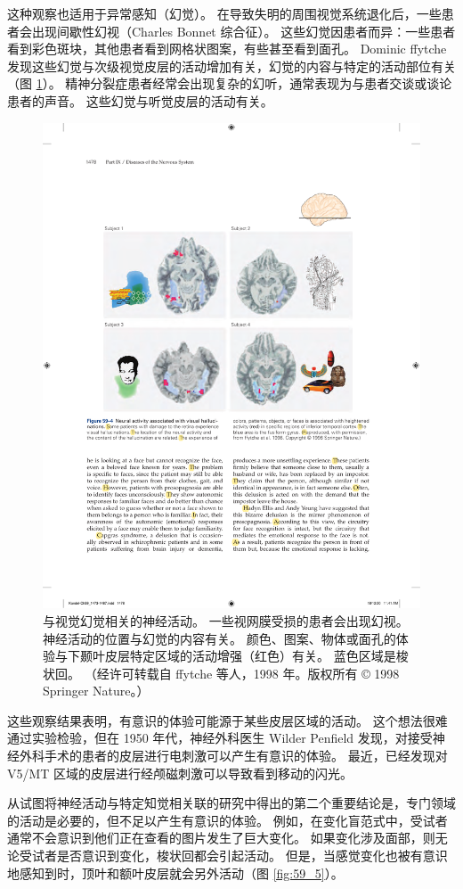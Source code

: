 这种观察也适用于异常感知（幻觉）。 在导致失明的周围视觉系统退化后，一些患者会出现间歇性幻视（Charles Bonnet 综合征）。 这些幻觉因患者而异：一些患者看到彩色斑块，其他患者看到网格状图案，有些甚至看到面孔。 
Dominic ffytche 发现这些幻觉与次级视觉皮层的活动增加有关，幻觉的内容与特定的活动部位有关（图 \ref{fig:59_4}）。 精神分裂症患者经常会出现复杂的幻听，通常表现为与患者交谈或谈论患者的声音。 这些幻觉与听觉皮层的活动有关。

\begin{figure}[htbp]
	\centering
	\includegraphics[width=0.8\linewidth]{chap59/fig_59_4}
	\caption{与视觉幻觉相关的神经活动。 一些视网膜受损的患者会出现幻视。 神经活动的位置与幻觉的内容有关。 颜色、图案、物体或面孔的体验与下颞叶皮层特定区域的活动增强（红色）有关。 蓝色区域是梭状回。 （经许可转载自 ffytche 等人，1998 年。版权所有 © 1998 Springer Nature。）}
	\label{fig:59_4}
\end{figure}

这些观察结果表明，有意识的体验可能源于某些皮层区域的活动。 这个想法很难通过实验检验，但在 1950 年代，神经外科医生 Wilder Penfield 发现，对接受神经外科手术的患者的皮层进行电刺激可以产生有意识的体验。 最近，已经发现对 V5/MT 区域的皮层进行经颅磁刺激可以导致看到移动的闪光。

从试图将神经活动与特定知觉相关联的研究中得出的第二个重要结论是，专门领域的活动是必要的，但不足以产生有意识的体验。 例如，在变化盲范式中，受试者通常不会意识到他们正在查看的图片发生了巨大变化。 如果变化涉及面部，则无论受试者是否意识到变化，梭状回都会引起活动。 但是，当感觉变化也被有意识地感知到时，顶叶和额叶皮层就会另外活动（图 \ref{fig:59_5}）。

